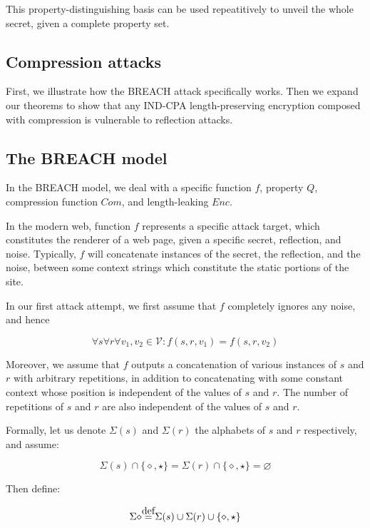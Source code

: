 \documentclass{article}
\let\emptyset\varnothing
\newcommand\defeq{\stackrel{\mathclap{\normalfont\mbox{def}}}{=}}
\begin{document}
This property-distinguishing basis can be used repeatitively to unveil the
whole secret, given a complete property set.

\subsection*{Compression attacks}

First, we illustrate how the BREACH attack specifically works.  Then we expand
our theorems to show that any IND-CPA length-preserving encryption composed
with compression is vulnerable to reflection attacks.

\subsection*{The BREACH model}
In the BREACH model, we deal with a specific function $f$, property $Q$,
compression function $Com$, and length-leaking $Enc$.

In the modern web, function $f$ represents a specific attack target, which
constitutes the renderer of a web page, given a specific secret, reflection,
and noise. Typically, $f$ will concatenate instances of the secret, the
reflection, and the noise, between some context strings which constitute the
static portions of the site.

In our first attack attempt, we first assume that $f$ completely ignores any
noise, and hence

\begin{equation*}
\forall s \forall r \forall v_1, v_2 \in \mathcal{V}: f(s, r, v_1) = f(s, r, v_2)
\end{equation*}

Moreover, we assume that $f$ outputs a concatenation of various instances of
$s$ and $r$ with arbitrary repetitions, in addition to concatenating with some
constant context whose position is independent of the values of $s$ and $r$.
The number of repetitions of $s$ and $r$ are also independent of the values of
$s$ and $r$.

Formally, let us denote $\Sigma(s)$ and $\Sigma(r)$ the alphabets of $s$ and
$r$ respectively, and assume:

\begin{equation*}
\Sigma(s) \cap \{\diamond, \star\}
=
\Sigma(r) \cap \{\diamond, \star\}
=
\emptyset
\end{equation*}

Then define:

\begin{equation*}
\Sigma\diamond \defeq \Sigma(s) \cup \Sigma(r) \cup \{\diamond, \star\}
\end{equation*}
\end{document}
